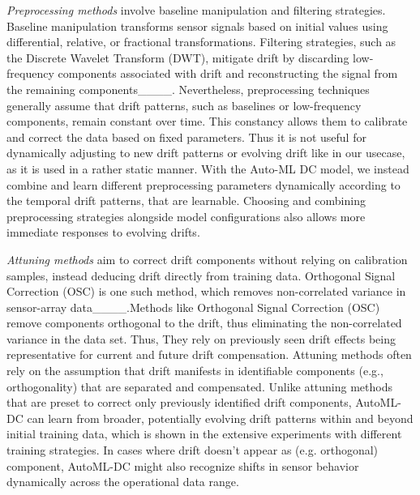 \emph{Preprocessing methods} involve baseline manipulation and filtering strategies. Baseline manipulation transforms sensor signals based on initial values using differential, relative, or fractional transformations. Filtering strategies, such as the Discrete Wavelet Transform (DWT), mitigate drift by discarding low-frequency components associated with drift and reconstructing the signal from the remaining components____. Nevertheless, preprocessing techniques generally assume that drift patterns, such as baselines or low-frequency components, remain constant over time. This constancy allows them to calibrate and correct the data based on fixed parameters. Thus it is not useful for dynamically adjusting to new drift patterns or evolving drift like in our usecase, as it is used in a rather static manner. With the Auto-ML DC model, we instead combine and learn different preprocessing parameters dynamically according to the temporal drift patterns, that are learnable. Choosing and combining preprocessing strategies alongside model configurations also allows more immediate responses to evolving drifts. 

\emph{Attuning methods} aim to correct drift components without relying on calibration samples, instead deducing drift directly from training data. Orthogonal Signal Correction (OSC) is one such method, which removes non-correlated variance in sensor-array data____.Methods like Orthogonal Signal Correction (OSC) remove components orthogonal to the drift, thus eliminating the non-correlated variance in the data set. Thus, They rely on previously seen drift effects being representative for current and future drift compensation. Attuning methods often rely on the assumption that drift manifests in identifiable components (e.g., orthogonality) that are separated and compensated. Unlike attuning methods that are preset to correct only previously identified drift components, AutoML-DC can learn from broader, potentially evolving drift patterns within and beyond initial training data, which is shown in the extensive experiments with different training strategies. In cases where drift doesn’t appear as (e.g. orthogonal) component, AutoML-DC might also recognize shifts in sensor behavior dynamically across the operational data range.


